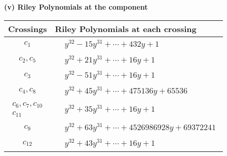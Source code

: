 \documentclass[1p]{elsarticle_modified}
\theoremstyle{definition}
\begin{document}
\newpage\renewcommand{\arraystretch}{1}
\flushleft \textbf{(v) Riley Polynomials at the component}\newline \\
\begin{tabular}{m{50pt}|m{274pt}}
Crossings & \hspace{64pt}Riley Polynomials at each crossing \\
\hline $$\begin{aligned}c_{1}\end{aligned}$$&$\begin{aligned}
&y^{32}-15 y^{31}+\cdots+432 y+1
\end{aligned}$\\
\hline $$\begin{aligned}c_{2},c_{5}\end{aligned}$$&$\begin{aligned}
&y^{32}+21 y^{31}+\cdots+16 y+1
\end{aligned}$\\
\hline $$\begin{aligned}c_{3}\end{aligned}$$&$\begin{aligned}
&y^{32}-51 y^{31}+\cdots+16 y+1
\end{aligned}$\\
\hline $$\begin{aligned}c_{4},c_{8}\end{aligned}$$&$\begin{aligned}
&y^{32}+45 y^{31}+\cdots+475136 y+65536
\end{aligned}$\\
\hline $$\begin{aligned}c_{6},c_{7},c_{10}\\c_{11}\end{aligned}$$&$\begin{aligned}
&y^{32}+35 y^{31}+\cdots+16 y+1
\end{aligned}$\\
\hline $$\begin{aligned}c_{9}\end{aligned}$$&$\begin{aligned}
&y^{32}+63 y^{31}+\cdots+4526986928 y+69372241
\end{aligned}$\\
\hline $$\begin{aligned}c_{12}\end{aligned}$$&$\begin{aligned}
&y^{32}+43 y^{31}+\cdots+16 y+1
\end{aligned}$\\
\hline
\end{tabular}\\~\\
\end{document}
